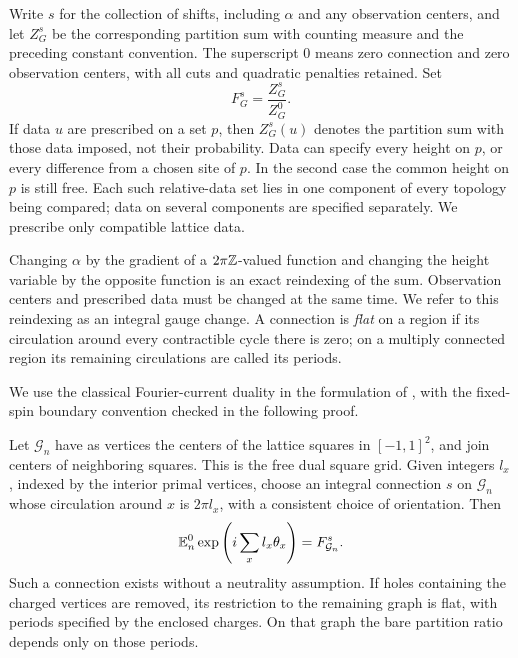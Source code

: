 Write \(s\) for the collection of shifts, including \(\alpha\) and any
observation centers, and let \(Z_G^s\) be the corresponding partition
sum with counting measure and the preceding constant convention. The
superscript \(0\) means zero connection and zero observation centers,
with all cuts and quadratic penalties retained. Set
\begin{equation}\label{heights:sector-ratio}
                         F_G^s=\frac{Z_G^s}{Z_G^0}.
\end{equation}
If data \(u\) are prescribed on a set \(p\), then \(Z_G^s(u)\)
denotes the partition sum with those data imposed, not their probability.
Data can specify every height on \(p\), or every difference from a
chosen site of \(p\). In the second case the common height on \(p\)
is still free. Each such relative-data set lies in one component of
every topology being compared; data on several components are
specified separately. We prescribe only compatible lattice data.

Changing \(\alpha\) by the gradient of a \(2\pi\mathbb Z\)-valued function
and changing the height variable by the opposite function is an exact
reindexing of the sum. Observation centers and prescribed data must be
changed at the same time. We refer to this reindexing as an integral
gauge change. A connection is \emph{flat} on a region if its circulation
around every contractible cycle there is zero; on a multiply connected
region its remaining circulations are called its periods.

We use the classical Fourier-current duality in the formulation of
\cite[Section~2]{vEL}, with the fixed-spin boundary convention checked
in the following proof.

\begin{lemma}\label{heights:duality}
Let \(\mathcal G_n\) have as vertices the centers of the lattice squares in
\([-1,1]^2\), and join centers of neighboring squares. This is the free
dual square grid. Given integers \(l_x\), indexed by the interior primal
vertices, choose an integral connection \(s\) on \(\mathcal G_n\) whose
circulation around \(x\) is \(2\pi l_x\), with a consistent choice of
orientation. Then
\[
       \mathbb E_n^0\exp\left(i\sum_xl_x\theta_x\right)=F_{\mathcal G_n}^s.
\]
Such a connection exists without a neutrality assumption. If holes
containing the charged vertices are removed, its restriction to the
remaining graph is flat, with periods specified by the enclosed charges.
On that graph the bare partition ratio depends only on those periods.
\end{lemma}

